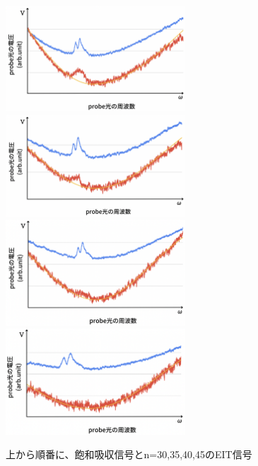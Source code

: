 \documentclass[dvipdfmx]{jsreport}
\begin{document}
\begin{figure}[hbtp]
\centering
\includegraphics[width=0.6\textwidth]{images/eit30.png}
\includegraphics[width=0.6\textwidth]{images/eit35.png}
\includegraphics[width=0.6\textwidth]{images/eit40.png}
\includegraphics[width=0.6\textwidth]{images/eit45.png}
\caption{\label{fig:eitn}上から順番に、飽和吸収信号とn=30,35,40,45のEIT信号}
\end{figure}

\clearpage
\end{document}
